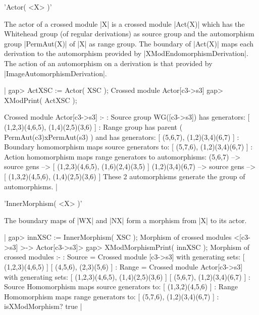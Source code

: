 {%
%

'Actor( <X> )'

The actor of a crossed module |X| is a crossed module |Act(X)|
which has the Whitehead group (of regular derivations) as source group
and the automorphism group |PermAut(X)| of |X| as range group.  
The boundary of |Act(X)| maps each derivation to the automorphism provided by
|XModEndomorphismDerivation|.  The action of an automorphism on a derivation
is that provided by  |ImageAutomorphismDerivation|.

|    gap> ActXSC := Actor( XSC );
    Crossed module Actor[c3->s3]
    gap> XModPrint( ActXSC );

    Crossed module Actor[c3->s3] :- 
    : Source group WG([c3->s3]) has generators:
      [ (1,2,3)(4,6,5), (1,4)(2,5)(3,6) ]
    : Range group has parent ( PermAut(c3)xPermAut(s3) ) and has
        generators: [ (5,6,7), (1,2)(3,4)(6,7) ]
    : Boundary homomorphism maps source generators to:
      [ (5,7,6), (1,2)(3,4)(6,7) ]
    : Action homomorphism maps range generators to automorphisms:
      (5,6,7) --> { source gens --> [ (1,2,3)(4,6,5), (1,6)(2,4)(3,5) ] }
      (1,2)(3,4)(6,7) -->
                  { source gens --> [ (1,3,2)(4,5,6), (1,4)(2,5)(3,6) ] }
      These 2 automorphisms generate the group of automorphisms.  |

%

'InnerMorphism( <X> )'

The boundary maps of |WX| and |NX| form a morphism from |X| to its actor.

|    gap> innXSC := InnerMorphism( XSC );
    Morphism of crossed modules <[c3->s3] >-> Actor[c3->s3]>
    gap> XModMorphismPrint( innXSC );
    Morphism of crossed modules :- 
    : Source = Crossed module [c3->s3] with generating sets:
      [ (1,2,3)(4,6,5) ]
      [ (4,5,6), (2,3)(5,6) ]
    :  Range = Crossed module Actor[c3->s3]
          with generating sets:
      [ (1,2,3)(4,6,5), (1,4)(2,5)(3,6) ]
      [ (5,6,7), (1,2)(3,4)(6,7) ]
    : Source Homomorphism maps source generators to:
      [ (1,3,2)(4,5,6) ]
    : Range Homomorphism maps range generators to:
      [ (5,7,6), (1,2)(3,4)(6,7) ]
    : isXModMorphism? true  |

%

}
